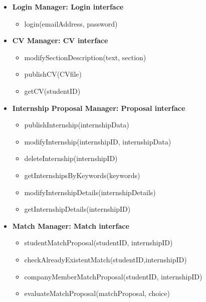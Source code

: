 \begin{itemize}
\begin{itemize}
        \item registerAsStudent(name, surname, dateOfBirth, password, emailAddress, universityName)
        \item confirmEmailAddress(emailAddress)
        \item registerUniversity(userInfo, universityName)
        \item registerCompany(userInfo, companyName, companyDescription)
    \end{itemize}
    \item \textbf{Login Manager: Login interface}
    \begin{itemize}
        \item login(emailAddress, password)
    \end{itemize}
    \item \textbf{CV Manager: CV interface}
    \begin{itemize}
        \item modifySectionDescription(text, section)
        \item publishCV(CVfile)
        \item getCV(studentID)
    \end{itemize}
    \item \textbf{Internship Proposal Manager: Proposal interface}
    \begin{itemize}
        \item publishInternship(internshipData)
        \item modifyInternship(internshipID, internshipData)
        \item deleteInternship(internshipID)
        \item getInternshipsByKeywords(keywords)
        \item modifyInternshipDetails(internshipDetails)
        \item getInternshipDetails(internshipID)
    \end{itemize}
    \item \textbf{Match Manager: Match interface}
    \begin{itemize}
        \item studentMatchProposal(studentID, internshipID)
        \item checkAlreadyExistentMatch(studentID,internshipID)
        \item companyMemberMatchProposal(studentID, internshipID)
        \item evaluateMatchProposal(matchProposal, choice)
    \end{itemize}

\end{itemize}
